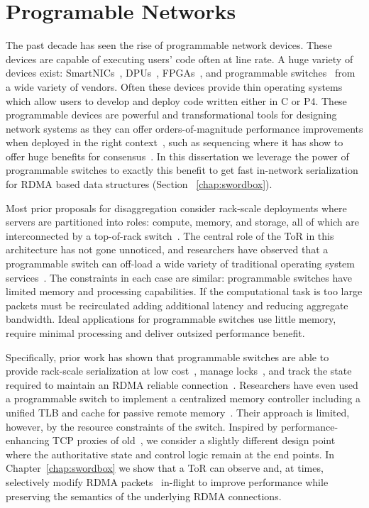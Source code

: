 \documentclass[12pt]{ucsddissertation}
\begin{document}
\section{Programable Networks}

The past decade has seen the rise of programmable network devices. These devices are capable of
executing users' code often at line rate. A huge variety of devices exist:
SmartNICs~\cite{fairnic,e3,ipipe,floem}, DPUs~\cite{dsnf},
FPGAs~\cite{azure-smartnic,clio,catapult,supernic}, and programmable
switches~\cite{p4,netchain,netcache,netlock} from a wide variety of vendors. Often these devices
provide thin operating systems which allow users to develop and deploy code written either in C or
P4. These programmable devices are powerful and transformational tools for designing network systems
as they can offer orders-of-magnitude performance improvements when deployed in the right
context~\cite{when-computer}, such as sequencing where it has show to offer huge benefits for
consensus~\cite{eris, nopaxos}. In this dissertation we leverage the power of programmable switches
to exactly this benefit to get fast in-network serialization for RDMA based data structures (Section
~\ref{chap:swordbox}).

Most prior proposals for disaggregation consider rack-scale deployments where
servers are partitioned into roles: compute, memory, and storage, all of which are interconnected by
a top-of-rack switch~\cite{disandapp,the-machine,intel-rack,firebox,legoos}.  The central role of
the ToR in this architecture has not gone unnoticed, and researchers have observed that a
programmable switch can off-load a wide variety of traditional operating system
services~\cite{disandapp,mind,netlock,netkv,netchain,netcache}. The constraints in each case are
similar: programmable switches have limited memory and processing capabilities.  If the
computational task is too large packets must be recirculated adding additional latency and reducing
aggregate bandwidth.  Ideal applications for programmable switches use little memory, require
minimal processing and deliver outsized performance benefit.

Specifically, prior work has shown that programmable switches are able to provide rack-scale
serialization at low cost~\cite{eris,no-paxos,when-computer,Grant2021InContRes}, manage
locks~\cite{netlock}, and track the state required to maintain an RDMA reliable
connection~\cite{tea}. Researchers have even used a programmable switch to implement a centralized
memory controller including a unified TLB and cache for passive remote memory~\cite{mind}.  Their
approach is limited, however, by the resource constraints of the switch.  Inspired by
performance-enhancing TCP proxies of old~\cite{snoop,rfc3135}, we consider a slightly different
design point where the authoritative state and control logic remain at the end points.  In
Chapter~\ref{chap:swordbox} we show that a ToR can observe and, at times, selectively modify RDMA
packets~\cite{switchml,Grant2021InContRes} in-flight to improve performance while preserving the
semantics of the underlying RDMA connections.
\end{document}
